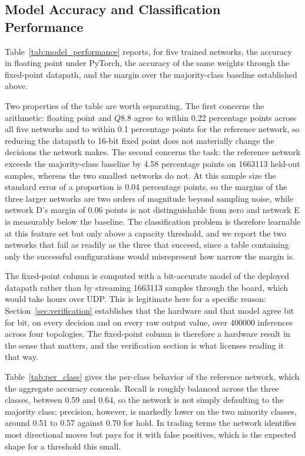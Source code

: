 \documentclass[final,5p,times,twocolumn]{elsarticle}
\begin{document}
\subsection{Model Accuracy and Classification Performance}
Table~\ref{tab:model_performance} reports, for five trained networks, the
accuracy in floating point under PyTorch, the accuracy of the same weights
through the fixed-point datapath, and the margin over the majority-class
baseline established above.

Two properties of the table are worth separating. The first concerns the
arithmetic: floating point and $Q8.8$ agree to within 0.22 percentage points
across all five networks and to within 0.1 percentage points for the reference
network, so reducing the datapath to 16-bit fixed point does not materially
change the decisions the network makes. The second concerns the task: the
reference network exceeds the majority-class baseline by 4.58 percentage points
on \num{1663113} held-out samples, whereas the two smallest networks do not. At
this sample size the standard error of a proportion is 0.04 percentage points, so
the margins of the three larger networks are two orders of magnitude beyond
sampling noise, while network D's margin of 0.06 points is not distinguishable
from zero and network E is measurably below the baseline. The classification problem is therefore learnable at this
feature set but only above a capacity threshold, and we report the two networks
that fail as readily as the three that succeed, since a table containing only
the successful configurations would misrepresent how narrow the margin is.

The fixed-point column is computed with a bit-accurate model of the deployed
datapath rather than by streaming \num{1663113} samples through the board, which
would take hours over UDP. This is legitimate here for a specific reason:
Section~\ref{sec:verification} establishes that the hardware and that model
agree bit for bit, on every decision and on every raw output value, over
\num{400000} inferences across four topologies. The fixed-point column is
therefore a hardware result in the sense that matters, and the verification
section is what licenses reading it that way.

Table~\ref{tab:per_class} gives the per-class behavior of the reference
network, which the aggregate accuracy conceals. Recall is roughly balanced
across the three classes, between 0.59 and 0.64, so the network is not simply
defaulting to the majority class; precision, however, is markedly lower on the
two minority classes, around 0.51 to 0.57 against 0.70 for hold. In trading
terms the network identifies most directional moves but pays for it with false
positives, which is the expected shape for a threshold this small.
\end{document}
